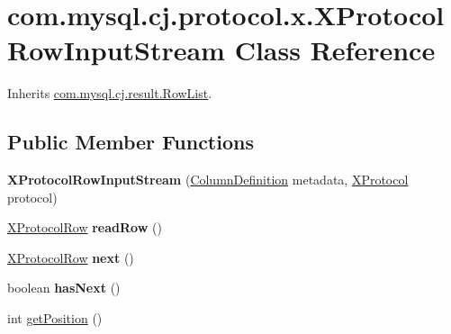 \hypertarget{classcom_1_1mysql_1_1cj_1_1protocol_1_1x_1_1_x_protocol_row_input_stream}{}\section{com.\+mysql.\+cj.\+protocol.\+x.\+X\+Protocol\+Row\+Input\+Stream Class Reference}
\label{classcom_1_1mysql_1_1cj_1_1protocol_1_1x_1_1_x_protocol_row_input_stream}


Inherits \mbox{\hyperlink{interfacecom_1_1mysql_1_1cj_1_1result_1_1_row_list}{com.\+mysql.\+cj.\+result.\+Row\+List}}.

\subsection*{Public Member Functions}
\begin{DoxyCompactItemize}
\item 
\mbox{\label{classcom_1_1mysql_1_1cj_1_1protocol_1_1x_1_1_x_protocol_row_input_stream_acee97cd932c810fa6761e25d33d908d6}} 
{\bfseries X\+Protocol\+Row\+Input\+Stream} (\mbox{\hyperlink{interfacecom_1_1mysql_1_1cj_1_1protocol_1_1_column_definition}{Column\+Definition}} metadata, \mbox{\hyperlink{classcom_1_1mysql_1_1cj_1_1protocol_1_1x_1_1_x_protocol}{X\+Protocol}} protocol)
\item 
\mbox{\label{classcom_1_1mysql_1_1cj_1_1protocol_1_1x_1_1_x_protocol_row_input_stream_afef0e6619e835e11b0b3e2fb4b10edec}} 
\mbox{\hyperlink{classcom_1_1mysql_1_1cj_1_1protocol_1_1x_1_1_x_protocol_row}{X\+Protocol\+Row}} {\bfseries read\+Row} ()
\item 
\mbox{\label{classcom_1_1mysql_1_1cj_1_1protocol_1_1x_1_1_x_protocol_row_input_stream_adaf699396a658535a997770a0214df52}} 
\mbox{\hyperlink{classcom_1_1mysql_1_1cj_1_1protocol_1_1x_1_1_x_protocol_row}{X\+Protocol\+Row}} {\bfseries next} ()
\item 
\mbox{\label{classcom_1_1mysql_1_1cj_1_1protocol_1_1x_1_1_x_protocol_row_input_stream_a7304f867f5dcd4d089c8e286683c8d04}} 
boolean {\bfseries has\+Next} ()
\item 
int \mbox{\hyperlink{classcom_1_1mysql_1_1cj_1_1protocol_1_1x_1_1_x_protocol_row_input_stream_ae168f4e9360c0d78dcb34cd3e3842d7c}{get\+Position}} ()
\end{DoxyCompactItemize}
